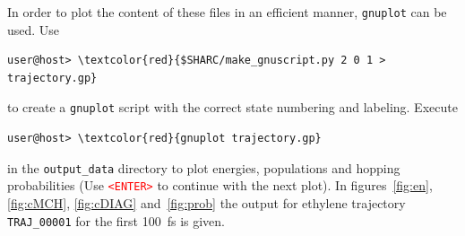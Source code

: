 \documentclass[a4paper,11pt,DIV=15,openany]{scrbook}
\newcommand{\ttt}[1]{\texttt{#1}}
\begin{document}
In order to plot the content of these files in an efficient manner, \ttt{gnuplot} can be used. Use
\begin{Verbatim}[commandchars=\\\{\}]
user@host> \textcolor{red}{$SHARC/make_gnuscript.py 2 0 1 > trajectory.gp}
\end{Verbatim}
to create a \ttt{gnuplot} script with the correct state numbering and labeling. Execute
\begin{Verbatim}[commandchars=\\\{\}]
user@host> \textcolor{red}{gnuplot trajectory.gp}
\end{Verbatim}
in the \ttt{output\_data} directory to plot energies, populations and hopping probabilities (Use \textcolor{red}{\ttt{<ENTER>}} to continue with the next plot). In figures~\ref{fig:en}, \ref{fig:cMCH}, \ref{fig:cDIAG} and~\ref{fig:prob} the output for ethylene trajectory \ttt{TRAJ\_00001} for the first 100~fs is given.
\end{document}
